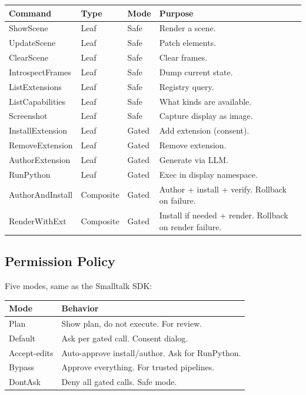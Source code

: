 \documentclass[a4paper,10pt]{article}
\begin{document}
\begin{center}
\begin{tabularx}{\linewidth}{@{}lll>{\raggedright\arraybackslash}X@{}}
\toprule
\textbf{Command} & \textbf{Type} & \textbf{Mode} & \textbf{Purpose} \\
\midrule
ShowScene        & Leaf & Safe   & Render a scene. \\
UpdateScene      & Leaf & Safe   & Patch elements. \\
ClearScene       & Leaf & Safe   & Clear frames. \\
IntrospectFrames & Leaf & Safe   & Dump current state. \\
ListExtensions   & Leaf & Safe   & Registry query. \\
ListCapabilities & Leaf & Safe   & What kinds are available. \\
Screenshot       & Leaf & Safe   & Capture display as image. \\
InstallExtension & Leaf & Gated  & Add extension (consent). \\
RemoveExtension  & Leaf & Gated  & Remove extension. \\
AuthorExtension  & Leaf & Gated  & Generate via LLM. \\
RunPython        & Leaf & Gated  & Exec in display namespace. \\
\midrule
AuthorAndInstall & Composite & Gated & Author + install + verify.
  Rollback on failure. \\
RenderWithExt    & Composite & Gated & Install if needed + render.
  Rollback on render failure. \\
\bottomrule
\end{tabularx}
\end{center}

\subsection{Permission Policy}

Five modes, same as the Smalltalk SDK:

\begin{center}
\begin{tabular}{@{}lp{8cm}@{}}
\toprule
\textbf{Mode} & \textbf{Behavior} \\
\midrule
Plan        & Show plan, do not execute.  For review. \\
Default     & Ask per gated call.  Consent dialog. \\
Accept-edits & Auto-approve install/author.  Ask for
  RunPython. \\
Bypass      & Approve everything.  For trusted pipelines. \\
DontAsk     & Deny all gated calls.  Safe mode. \\
\bottomrule
\end{tabular}
\end{center}
\end{document}
